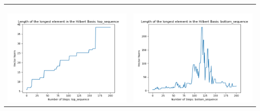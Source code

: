 \documentclass[10pt]{article}
\begin{document}
\begin{tabular}{c|c}
\begin{minipage}{.45\textwidth}
\end{minipage} \\ \\
\hline \\\begin{minipage}{.45\textwidth}
\includegraphics[width=\textwidth]{"DATA/5d/5 generators 2 bound I/top_sequence LENGTH"}
\end{minipage} &
\begin{minipage}{.45\textwidth}
\includegraphics[width=\textwidth]{"DATA/5d/5 generators 2 bound I bottomup/bottom_sequence LENGTH"}
\end{minipage}
\end{tabular}
\end{document}
